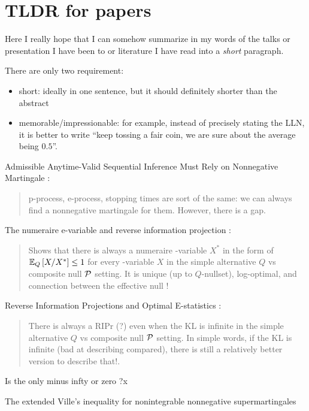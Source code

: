 \clearpage
\section{TLDR for papers}

Here I really hope that I can somehow summarize in my words of the talks or presentation 
I have been to or literature I have read into a \textit{short} paragraph.

There are only two requirement:
\begin{itemize}
    \item short: ideally in one sentence, but it should definitely shorter than the abstract
    \item memorable/impressionable: for example, instead of precisely stating the LLN, 
        it is better to write ``keep tossing a fair coin, we are sure about the average being $0.5$''.
\end{itemize}


Admissible Anytime-Valid Sequential Inference Must Rely on Nonnegative Martingale \citep{ramdasAdmissibleAnytimevalidSequential2022}:
\begin{quote}
    p-process, e-process, stopping times are sort of the same: we can always find a nonnegative martingale for them.
    However, there is a gap.
\end{quote}

The numeraire e-variable and reverse information projection
\citep{larssonNumeraireEvariableReverse2024}:
\begin{quote}
    Shows that there is always a numeraire \E-variable $X^*$ in the form of $\operatorname{\mathbb{E}}_{Q} \left[ {X/X^*} \right] \leq 1$ 
    for every \E-variable $X$ in the simple alternative $Q$ vs composite null $\mathcal{P}$ setting. 
    It is unique (up to $Q$-nullset), log-optimal, and connection between the effective null !
\end{quote}

Reverse Information Projections and Optimal E-statistics
\citep{lardyReverseInformationProjections2024}:
\begin{quote}
    There is always a RIPr (?) even when the KL is infinite in the simple alternative $Q$ vs composite null $\mathcal{P}$ setting. 
    In simple words, if the KL is infinite (bad at describing compared), there is still a 
    relatively better version to describe that!.
\end{quote}

Is the only minus infty or zero ?x 

The extended Ville's inequality for nonintegrable nonnegative supermartingales
